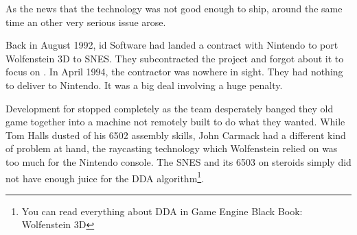 \par
{}%
\label{HUD_screenshot}
\par
As the news that the technology was not good enough to ship, around the same time an other very serious issue arose.\\
\par
Back in August 1992, id Software had landed a contract with Nintendo to port Wolfenstein 3D to SNES. They subcontracted the project and forgot about it to focus on \doom. In April 1994, the contractor was nowhere in sight. They had nothing to deliver to Nintendo. It was a big deal involving a huge penalty.\\
\par
 Development for \doom stopped completely as the team desperately banged they old game together into a machine not remotely built to do what they wanted. While Tom Halls dusted of his 6502 assembly skills, John Carmack had a different kind of problem at hand, the raycasting technology which Wolfenstein relied on was too much for the Nintendo console. The SNES and its 6503 on steroids simply did not have enough juice for the DDA algorithm\footnote{You can read everything about DDA in Game Engine Black Book: Wolfenstein 3D}.\\%
\par



